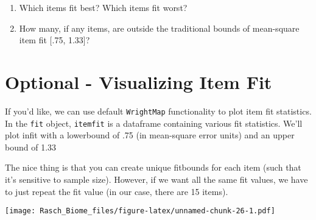 \documentclass[
]{book}
\newenvironment{Shaded}{\begin{snugshade}}{\end{snugshade}}
\newcommand{\AttributeTok}[1]{\textcolor[rgb]{0.77,0.63,0.00}{#1}}
\newcommand{\CommentTok}[1]{\textcolor[rgb]{0.56,0.35,0.01}{\textit{#1}}}
\newcommand{\DecValTok}[1]{\textcolor[rgb]{0.00,0.00,0.81}{#1}}
\newcommand{\FloatTok}[1]{\textcolor[rgb]{0.00,0.00,0.81}{#1}}
\newcommand{\FunctionTok}[1]{\textcolor[rgb]{0.00,0.00,0.00}{#1}}
\newcommand{\NormalTok}[1]{#1}
\newcommand{\OtherTok}[1]{\textcolor[rgb]{0.56,0.35,0.01}{#1}}
\newcommand{\SpecialCharTok}[1]{\textcolor[rgb]{0.00,0.00,0.00}{#1}}
\providecommand{\tightlist}{%
  \setlength{\itemsep}{0pt}\setlength{\parskip}{0pt}}
\begin{document}
\begin{enumerate}
\def\labelenumi{\arabic{enumi}.}
\tightlist
\item
  Which items fit best? Which items fit worst?
\item
  How many, if any items, are outside the traditional bounds of mean-square item fit {[}.75, 1.33{]}?
\end{enumerate}

\hypertarget{optional---visualizing-item-fit}{%
\section{Optional - Visualizing Item Fit}\label{optional---visualizing-item-fit}}

If you'd like, we can use default \texttt{WrightMap} functionality to plot item fit statistics. In the \texttt{fit} object, \texttt{itemfit} is a dataframe containing various fit statistics. We'll plot infit with a lowerbound of .75 (in mean-square error units) and an upper bound of 1.33

The nice thing is that you can create unique fitbounds for each item (such that it's sensitive to sample size). However, if we want all the same fit values, we have to just repeat the fit value (in our case, there are 15 items).

\begin{Shaded}
\end{Shaded}

\texttt{[image: Rasch\_Biome\_files/figure-latex/unnamed-chunk-26-1.pdf]}
\end{document}
